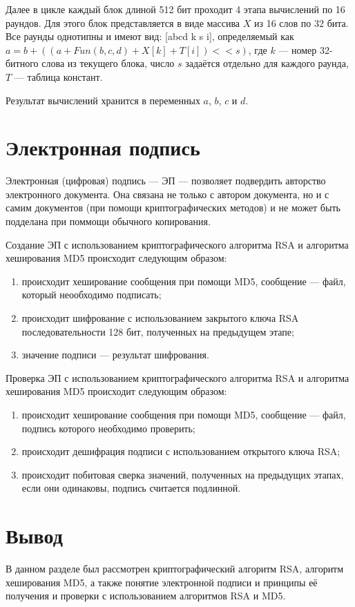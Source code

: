 Далее в цикле каждый блок длиной 512 бит проходит 4 этапа вычислений по 16 раундов. Для этого блок представляется в виде массива $X$ из 16 слов по 32 бита.
Все раунды однотипны и имеют вид: [abcd k s i], определяемый как $a = b + ((a +Fun(b, c,d) + X[k] + T[i]	) << s)$, где $k$ --- номер 32-битного слова из текущего блока, число $s$ задаётся отдельно для каждого раунда, $T$ --- таблица констант.

Результат вычислений хранится в переменных  $a$, $b$, $c$ и $d$.

\section{Электронная подпись}

Электронная (цифровая) подпись --- ЭП --- позволяет подвердить авторство электронного документа. Она связана не только с автором документа, но и с самим документов (при помощи криптографических методов) и не может быть подделана при поммощи обычного копирования.

Создание ЭП с использованием криптографического алгоритма RSA и алгоритма хеширования MD5 происходит следующим образом:
\begin{enumerate}[label=\arabic*)]
	\item происходит хеширование сообщения при помощи MD5, сообщение --- файл, который неообходимо подписать;
    \item происходит шифрование с использованием закрытого ключа RSA последовательности 128 бит, полученных на предыдущем этапе;
	\item значение подписи --- результат шифрования.
\end{enumerate}

Проверка ЭП с использованием криптографического алгоритма RSA и алгоритма хеширования MD5 происходит следующим образом:
\begin{enumerate}[label=\arabic*)]
	\item происходит хеширование сообщения при помощи MD5, сообщение --- файл, подпись которого необходимо проверить;
    \item происходит дешифрация подписи с использованием открытого ключа RSA;
	\item происходит побитовая сверка значений, полученных на предыдущих этапах, если они одинаковы, подпись считается подлинной.
\end{enumerate}

\section*{Вывод}

В данном разделе был рассмотрен криптографический алгоритм RSA, алгоритм хеширования MD5, а также понятие электронной подписи и принципы её получения и проверки с использованием алгоритмов RSA и MD5.

